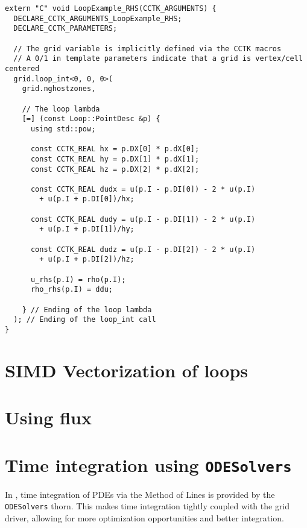 \begin{lstlisting}
extern "C" void LoopExample_RHS(CCTK_ARGUMENTS) {
  DECLARE_CCTK_ARGUMENTS_LoopExample_RHS;
  DECLARE_CCTK_PARAMETERS;

  // The grid variable is implicitly defined via the CCTK macros
  // A 0/1 in template parameters indicate that a grid is vertex/cell centered
  grid.loop_int<0, 0, 0>(
    grid.nghostzones,

    // The loop lambda
    [=] (const Loop::PointDesc &p) {
      using std::pow;

      const CCTK_REAL hx = p.DX[0] * p.dX[0];
      const CCTK_REAL hy = p.DX[1] * p.dX[1];
      const CCTK_REAL hz = p.DX[2] * p.dX[2];
      
      const CCTK_REAL dudx = u(p.I - p.DI[0]) - 2 * u(p.I) 
        + u(p.I + p.DI[0])/hx;

      const CCTK_REAL dudy = u(p.I - p.DI[1]) - 2 * u(p.I) 
        + u(p.I + p.DI[1])/hy;

      const CCTK_REAL dudz = u(p.I - p.DI[2]) - 2 * u(p.I) 
        + u(p.I + p.DI[2])/hz;

      u_rhs(p.I) = rho(p.I);
      rho_rhs(p.I) = ddu;

    } // Ending of the loop lambda
  ); // Ending of the loop_int call
}
\end{lstlisting}

\section{SIMD Vectorization of loops}
\label{sec:simd_loops}

\section{Using flux}
\label{sec:flux}

\section{Time integration using \texttt{ODESolvers}}
\label{sec:odesolvers}

In \CarpetX, time integration of PDEs via the Method of Lines is provided by the \texttt{ODESolvers} thorn. This makes time integration tightly coupled with the grid driver, allowing for more optimization opportunities and better integration.

